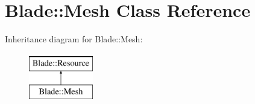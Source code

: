 \hypertarget{class_blade_1_1_mesh}{}\section{Blade\+:\+:Mesh Class Reference}
\label{class_blade_1_1_mesh}
Inheritance diagram for Blade\+:\+:Mesh\+:\begin{figure}[H]
\begin{center}
\leavevmode
\includegraphics[height=2.000000cm]{class_blade_1_1_mesh}
\end{center}
\end{figure}
